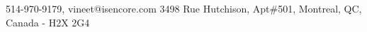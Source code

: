 \documentclass{resume} %
\begin{document}
\begin{hSubsection}{514-970-9179, vineet@isencore.com}
{%
}{3498 Rue Hutchison, Apt\#501, Montreal, QC, Canada - H2X 2G4}
\end{hSubsection}




 
\end{document}
